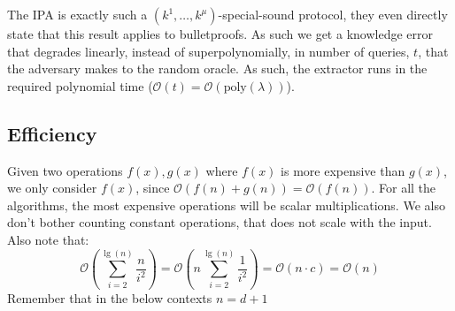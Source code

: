\documentclass[
]{article}
\newcommand*\Oc{\mathcal{O}}
\renewcommand*\l{\lambda}
\newcommand*{\poly}{\text{poly}}
\begin{document}
The IPA is exactly such a \((k^1, \dots,k^\mu)\)-special-sound protocol,
they even directly state that this result applies to bulletproofs. As
such we get a knowledge error that degrades linearly, instead of
superpolynomially, in number of queries, \(t\), that the adversary makes
to the random oracle. As such, the extractor runs in the required
polynomial time (\(\Oc(t) = \Oc(\poly(\l))\)).

\subsection{Efficiency}\label{efficiency}

Given two operations \(f(x), g(x)\) where \(f(x)\) is more expensive
than \(g(x)\), we only consider \(f(x)\), since
\(\Oc(f(n) + g(n)) = \Oc (f(n))\). For all the algorithms, the most
expensive operations will be scalar multiplications. We also don't
bother counting constant operations, that does not scale with the input.
Also note that: \[
  \Oc\left(\sum_{i=2}^{\lg(n)} \frac{n}{i^2}\right) = \Oc\left(n \sum_{i=2}^{\lg(n)} \frac{1}{i^2}\right)
                                       = \Oc(n \cdot c)
                                       = \Oc(n)
\] Remember that in the below contexts \(n = d+1\)
\end{document}
